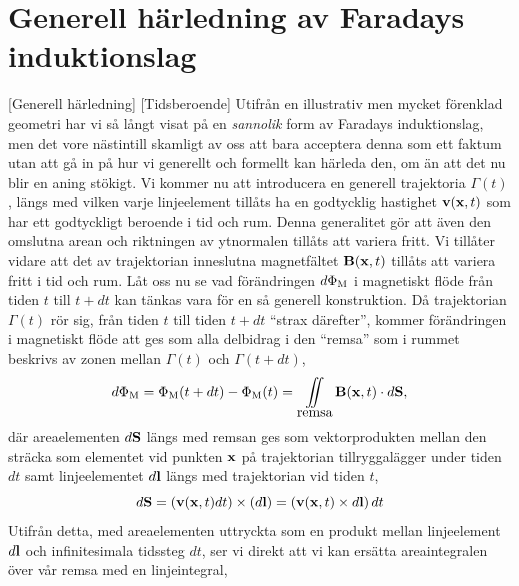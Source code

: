\section{Generell h{\"a}rledning av Faradays induktionslag}
[Generell h{\"a}rledning]
[Tidsberoende]
Utifr{\aa}n en illustrativ men mycket f{\"o}renklad geometri har vi s{\aa}
l{\aa}ngt visat p{\aa} en {\it sannolik} form av Faradays induktionslag, men
det vore n{\"a}stintill skamligt av oss att bara acceptera denna som ett faktum
utan att g{\aa} in p{\aa} hur vi generellt och formellt kan h{\"a}rleda den,
om {\"a}n att det nu blir en aning st{\"o}kigt. Vi kommer nu att introducera
en generell trajektoria $\Gamma(t)$, l{\"a}ngs med vilken varje linjeelement
till{\aa}ts ha en godtycklig hastighet ${\bf v}({\bf x},t)$ som har ett
godtyckligt beroende i tid och rum. Denna generalitet g{\"o}r att {\"a}ven den
omslutna arean och riktningen av ytnormalen till{\aa}ts att variera fritt.
Vi till{\aa}ter vidare att det av trajektorian inneslutna magnetf{\"a}ltet
${\bf B}({\bf x},t)$ till{\aa}ts att variera fritt i tid och
rum.
\noindent
L{\aa}t oss nu se vad f{\"o}r{\"a}ndringen $d\Phi_{\rm M}$ i magnetiskt fl{\"o}de
fr{\aa}n tiden $t$ till $t+dt$ kan t{\"a}nkas vara f{\"o}r en s{\aa} generell
konstruktion.
D{\aa} trajektorian $\Gamma(t)$ r{\"o}r sig, fr{\aa}n tiden $t$ till tiden
$t+dt$ ``strax d{\"a}refter'', kommer f{\"o}r{\"a}ndringen i magnetiskt
fl{\"o}de att ges som alla delbidrag i den ``remsa'' som i rummet beskrivs
av zonen mellan $\Gamma(t)$ och $\Gamma(t+dt)$,
$$
  d\Phi_{\rm M}=\Phi_{\rm M}(t+dt)-\Phi_{\rm M}(t)
    =\iint_{\hbox{remsa}}{\bf B}({\bf x},t)\cdot d{\bf S},
$$
d{\"a}r areaelementen $d{\bf S}$ l{\"a}ngs med remsan ges som vektorprodukten
mellan den str{\"a}cka som elementet vid punkten ${\bf x}$ p{\aa} trajektorian
tillryggal{\"a}gger under tiden $dt$ samt linjeelementet $d{\bf l}$ l{\"a}ngs
med trajektorian vid tiden $t$,
$$
  d{\bf S}=({\bf v}({\bf x},t)dt)\times(d{\bf l})
    =({\bf v}({\bf x},t)\times d{\bf l})\,dt
$$
Utifr{\aa}n detta, med areaelementen uttryckta som en produkt mellan
linjeelement $d{\bf l}$ och infinitesimala tidssteg $dt$, ser vi direkt att
vi kan ers{\"a}tta areaintegralen {\"o}ver v{\aa}r remsa med en linjeintegral,
